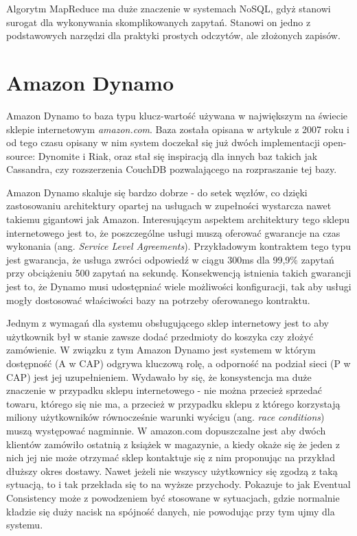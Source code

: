 Algorytm MapReduce ma duże znaczenie w systemach NoSQL, gdyż stanowi surogat dla wykonywania skomplikowanych zapytań.
Stanowi on jedno z podstawowych narzędzi dla praktyki prostych odczytów, ale złożonych zapisów.

\section{Amazon Dynamo}

Amazon Dynamo to baza typu klucz-wartość używana w największym na świecie sklepie internetowym \emph{amazon.com}.
Baza została opisana w artykule z 2007 roku \cite{amazon-dynamo} i od tego czasu opisany w nim system doczekał się już dwóch implementacji open-source: Dynomite i Riak, oraz stał się inspiracją dla innych baz takich jak Cassandra, czy rozszerzenia CouchDB pozwalającego na rozpraszanie tej bazy.

Amazon Dynamo skaluje się bardzo dobrze - do setek węzłów, co dzięki zastosowaniu architektury opartej na usługach w zupełności wystarcza nawet takiemu gigantowi jak Amazon.
Interesującym aspektem architektury tego sklepu internetowego jest to, że poszczególne usługi muszą oferować gwarancje na czas wykonania (ang. \emph{Service Level Agreements}).
Przykładowym kontraktem tego typu jest gwarancja, że usługa zwróci odpowiedź w ciągu 300ms dla 99,9\% zapytań przy obciążeniu 500 zapytań na sekundę.
Konsekwencją istnienia takich gwarancji jest to, że Dynamo musi udostępniać wiele możliwości konfiguracji, tak aby usługi mogły dostosować właściwości bazy na potrzeby oferowanego kontraktu.

Jednym z wymagań dla systemu obsługującego sklep internetowy jest to aby użytkownik był w stanie zawsze dodać przedmioty do koszyka czy złożyć zamówienie.
W związku z tym Amazon Dynamo jest systemem w którym dostępność (A w CAP) odgrywa kluczową rolę, a odporność na podział sieci (P w CAP) jest jej uzupełnieniem.
Wydawało by się, że konsystencja ma duże znaczenie w przypadku sklepu internetowego - nie można przecież sprzedać towaru, którego się nie ma, a przecież w przypadku sklepu z którego korzystają miliony użytkowników równocześnie warunki wyścigu (ang. \emph{race conditions}) muszą występować nagminnie.
W amazon.com dopuszczalne jest aby dwóch klientów zamówiło ostatnią z książek w magazynie, a kiedy okaże się że jeden z nich jej nie może otrzymać sklep kontaktuje się z nim proponując na przykład dłuższy okres dostawy.
Nawet jeżeli nie wszyscy użytkownicy się zgodzą z taką sytuacją, to i tak przekłada się to na wyższe przychody.
Pokazuje to jak Eventual Consistency może z powodzeniem być stosowane w sytuacjach, gdzie normalnie kładzie się duży nacisk na spójność danych, nie powodując przy tym ujmy dla systemu.

